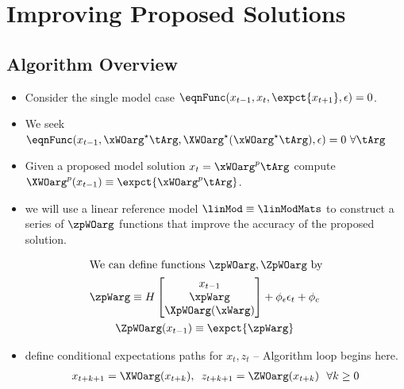 \documentclass[12pt]{article}
\begin{document}
\section{Improving Proposed  Solutions}
\label{sec:algoforsoln}



\subsection{Algorithm Overview}
\label{sec:pseudocode}
{
  \begin{itemize}
  \item Consider the single model case $  \eqnFunc(x_{t-1},x_t,\expct{x_{t+1}},\epsilon)=0$.  
\item We seek $\eqnFunc(x_{t-1},\xWOarg^\star\tArg,\XWOarg^\star(\xWOarg^\star\tArg),\epsilon)=0\,\,\forall \tArg $
\item Given a proposed model solution $x_t=\xWOarg^p\tArg$ compute $\XWOarg^p(x_{t-1})\equiv \expct{\xWOarg^p\tArg}$. 
\item we will use a linear reference model $\linMod  \equiv \linModMats$ 
to construct a series of $\zpWOarg$ functions that improve the accuracy of the proposed solution.
\end{itemize}
}



\begin{gather*}
 \intertext{We can define functions $\zpWOarg,\ZpWOarg$ by}
\zpWarg\equiv H
\begin{bmatrix}
x_{t-1}\\ \xpWarg\\ \XpWOarg(\xWarg)
\end{bmatrix}+\phi_\epsilon \epsilon_t+\phi_c\\
\ZpWOarg(x_{t-1})\equiv \expct{\zpWarg}
\end{gather*}
 \begin{itemize}
\item  define conditional expectations paths for $x_t, z_t$ -- {\color{green}Algorithm loop begins here.}
 \begin{gather*}
 x_{t+k+1}=\XWOarg(x_{t+k}),\,\,\,z_{t+k+1}=\ZWOarg(x_{t+k})\,\,\,\,  \forall k\ge 0      \end{gather*}
   \end{itemize}
\end{document}
